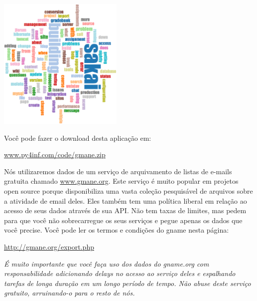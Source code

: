 \beforefig
\centerline{\includegraphics[height=2.50in]{figs2/wordcloud.eps}}
\afterfig

Você pode fazer o download desta aplicação em:

\url{www.py4inf.com/code/gmane.zip}

Nós utilizaremos dados de um serviço de arquivamento de listas de e-mails
gratuita chamado \url{www.gmane.org}. Este serviço é muito popular em projetos
open source porque disponibiliza uma vasta coleção pesquisável de arquivos sobre
a atividade de email deles. Eles também tem uma política liberal em relação
ao acesso de seus dados através de sua API. Não tem taxas de limites, mas pedem
para que você não sobrecarregue os seus serviços e pegue apenas os dados
que você precise. Você pode ler os termos e condições do gname nesta página:

\url{http://gmane.org/export.php}

{\em É muito importante que você faça uso dos dados do gname.org com
responsabilidade adicionando delays no acesso ao serviço deles e 
espalhando tarefas de longa duração em um longo período de tempo.
Não abuse deste serviço gratuito, arruinando-o para o resto de nós.}


